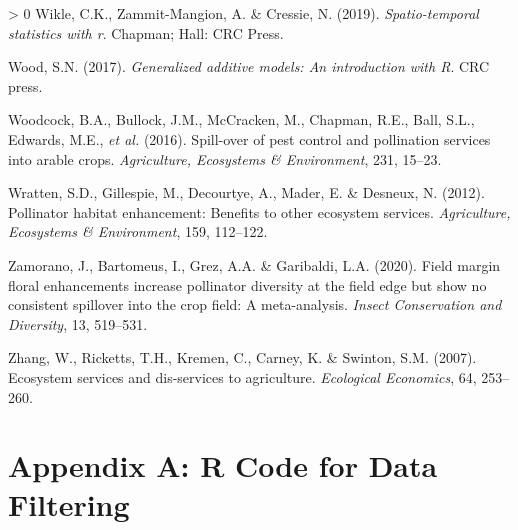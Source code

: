\documentclass[]{elsarticle} %
\newlength{\cslhangindent}
\newenvironment{CSLReferences}[3] %
 {%
  \setlength{\parindent}{0pt}
  \ifodd #1 \everypar{\setlength{\hangindent}{\cslhangindent}}\ignorespaces\fi
  \ifnum #2 > 0
  \setlength{\parskip}{#2\baselineskip}
  \fi
 }%
 {}
\begin{document}
\begin{CSLReferences}{1}{0}
\leavevmode\hypertarget{ref-wickle2019}{}%
Wikle, C.K., Zammit-Mangion, A. \& Cressie, N. (2019). \emph{Spatio-temporal statistics with r}. Chapman; Hall: CRC Press.

\leavevmode\hypertarget{ref-wood2017}{}%
Wood, S.N. (2017). \emph{Generalized additive models: An introduction with {R}}. CRC press.

\leavevmode\hypertarget{ref-woodcock2016}{}%
Woodcock, B.A., Bullock, J.M., McCracken, M., Chapman, R.E., Ball, S.L., Edwards, M.E., \emph{et al.} (2016). Spill-over of pest control and pollination services into arable crops. \emph{Agriculture, Ecosystems \& Environment}, 231, 15--23.

\leavevmode\hypertarget{ref-wratten2012}{}%
Wratten, S.D., Gillespie, M., Decourtye, A., Mader, E. \& Desneux, N. (2012). Pollinator habitat enhancement: Benefits to other ecosystem services. \emph{Agriculture, Ecosystems {\&} Environment}, 159, 112--122.

\leavevmode\hypertarget{ref-zamorano2020}{}%
Zamorano, J., Bartomeus, I., Grez, A.A. \& Garibaldi, L.A. (2020). Field margin floral enhancements increase pollinator diversity at the field edge but show no consistent spillover into the crop field: A meta-analysis. \emph{Insect Conservation and Diversity}, 13, 519--531.

\leavevmode\hypertarget{ref-zhang2007}{}%
Zhang, W., Ricketts, T.H., Kremen, C., Carney, K. \& Swinton, S.M. (2007). Ecosystem services and dis-services to agriculture. \emph{Ecological Economics}, 64, 253--260.

\end{CSLReferences}

\singlespacing
\nolinenumbers

\newpage

\hypertarget{appendix-a-r-code-for-data-filtering}{%
\section*{Appendix A: R Code for Data Filtering}\label{appendix-a-r-code-for-data-filtering}}
\end{document}
